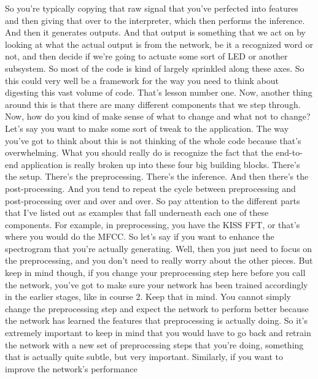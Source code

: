      So you're typically copying that raw signal
     that you've perfected into features and then giving that over
     to the interpreter, which then performs the inference.
     And then it generates outputs.
     And that output is something that we act on
     by looking at what the actual output is from the network,
     be it a recognized word or not, and then decide
     if we're going to actuate some sort of LED or another subsystem.
     So most of the code is kind of largely sprinkled along these axes.
     So this could very well be a framework for the way
     you need to think about digesting this vast volume of code.
     That's lesson number one.
     Now, another thing around this is that there are many different components
     that we step through.
     Now, how do you kind of make sense of what to change and what not to change?
     Let's say you want to make some sort of tweak to the application.
     The way you've got to think about this is not thinking of the whole code
     because that's overwhelming.
     What you should really do is recognize the fact
     that the end-to-end application is really broken up
     into these four big building blocks.
     There's the setup.
     There's the preprocessing.
     There's the inference.
     And then there's the post-processing.
     And you tend to repeat the cycle between preprocessing and post-processing
     over and over and over.
     So pay attention to the different parts that I've
     listed out as examples that fall underneath each one
     of these components.
     For example, in preprocessing, you have the KISS FFT,
     or that's where you would do the MFCC.
     So let's say if you want to enhance the spectrogram that you're actually
     generating.
     Well, then you just need to focus on the preprocessing,
     and you don't need to really worry about the other pieces.
     But keep in mind though, if you change your preprocessing step here before you
     call the network, you've got to make sure your network has
     been trained accordingly in the earlier stages, like in course 2.
     Keep that in mind.
     You cannot simply change the preprocessing step and expect
     the network to perform better because the network has learned the features
     that preprocessing is actually doing.
     So it's extremely important to keep in mind
     that you would have to go back and retrain
     the network with a new set of preprocessing steps that you're doing,
     something that is actually quite subtle, but very important.
     Similarly, if you want to improve the network's performance
